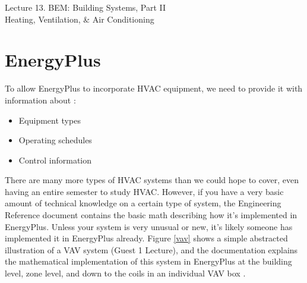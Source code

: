 \documentclass[10pt]{article}
\begin{document}
   \noindent
   \begin{center}

   \hrulefill
   
   \vspace{5pt}
   
   \vspace{0pt}
   
   {\Large \hfill  Lecture 13. BEM: Building Systems, Part II\\ \hfill {\large Heating, Ventilation, \& Air Conditioning}}
   \vspace{5pt}
   
  
   \hrulefill
   \end{center}

   {}


\section{EnergyPlus}

To allow EnergyPlus to incorporate HVAC equipment, we need to provide it with information about \cite{EPcourseteaching}:

\vspace{-6pt}
\begin{itemize}
    \setlength{\itemsep}{0pt}%
    \setlength{\parskip}{0pt}%
    \item Equipment types
    \item Operating schedules
    \item Control information
\end{itemize}
\vspace{-6pt}

There are many more types of HVAC systems than we could hope to cover, even having an entire semester to study HVAC. However, if you have a very basic amount of technical knowledge on a certain type of system, the Engineering Reference document \cite{EPdocs9engineering} contains the basic math describing how it's implemented in EnergyPlus. Unless your system is very unusual or new, it's likely someone has implemented it in EnergyPlus already. Figure \ref{vav} shows a simple abstracted illustration of a VAV system (Guest 1 Lecture), and the documentation explains the mathematical implementation of this system in EnergyPlus at the building level, zone level, and down to the coils in an individual VAV box \cite{EPdocs9engineering}. 
\end{document}
